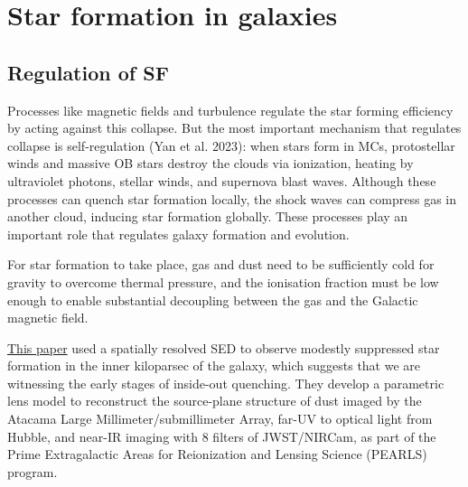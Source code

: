 \chapter{Star formation in galaxies}

\section{Regulation of SF}

Processes like magnetic fields and turbulence regulate the star forming efficiency by acting against this collapse. But the most important mechanism that regulates collapse is self-regulation (Yan et al. 2023): when stars form in MCs, protostellar winds and massive OB stars destroy the clouds via ionization, heating by ultraviolet photons, stellar winds, and supernova blast waves. Although these processes can quench star formation locally, the shock waves can compress gas in another cloud, inducing star formation globally. These processes play an important role that regulates galaxy
formation and evolution.


For star formation to take place, gas and dust need to be sufficiently cold for gravity to overcome thermal pressure, and the ionisation fraction must be low enough to enable substantial decoupling between the gas and the Galactic magnetic field.



\href{https://arxiv.org/pdf/2303.05054.pdf}{This paper} used a spatially resolved SED to observe modestly suppressed star formation in the inner kiloparsec of the galaxy, which suggests that we are witnessing the early stages of inside-out quenching. They develop a parametric lens model to reconstruct the source-plane structure of dust imaged by the Atacama Large Millimeter/submillimeter Array, far-UV to optical light from Hubble, and near-IR imaging with 8 filters of JWST/NIRCam, as part of the Prime Extragalactic Areas for Reionization and Lensing Science (PEARLS) program.